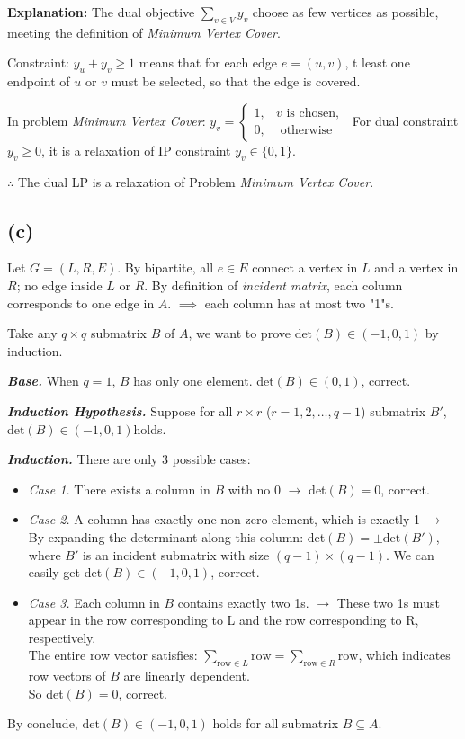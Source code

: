 \documentclass[11pt]{article}
\begin{document}
\textbf{Explanation: }The dual objective $\sum_{v \in V} y_v $ choose as few vertices as possible, meeting the definition of \textit{Minimum Vertex Cover}. 

Constraint: $y_u + y_v \ge 1$ means that for each edge $e = (u, v)$, 
t least one endpoint of $u$ or $v$ must be selected, so that the edge is covered.

In problem \textit{Minimum Vertex Cover}: $y_v = \begin{cases}
    1, & v \text{ is chosen, } \\
    0, & \text{ otherwise}
\end{cases}$
For dual constraint $y_v \ge 0$, it is a relaxation of IP constraint $y_v \in \{0, 1\}$. 

$\therefore$ The dual LP is a relaxation of Problem \textit{Minimum Vertex Cover}. 

\subsection*{(c)}
Let $G = (L, R, E)$. By bipartite, all $e \in E$ connect a vertex in $L$ and a vertex in $R$; no edge inside $L $ or $R$. 
By definition of \textit{incident matrix}, each column corresponds to one edge in $A$. 
$\implies$ each column has at most two "1"s.

Take any $q \times q$ submatrix $B$ of $A$, we want to prove $\text{det}(B) \in (-1, 0, 1)$ by induction. 

\textit{\textbf{Base.} }When $q = 1$, $B $ has only one element. det$(B) \in (0, 1)$, correct. 

\textit{\textbf{Induction Hypothesis.} }Suppose for all $r \times r$ ($r =1, 2, \dots, q-1$) submatrix $B'$, det$(B) \in (-1, 0, 1) $holds. 

\textit{\textbf{Induction.} }There are only 3 possible cases: 
\begin{itemize}
    \item \textit{Case 1. }There exists a column in $B$ with no 0 $ \to $ det$(B) = 0$, correct. 
    \item \textit{Case 2. }A column has exactly one non-zero element, which is exactly 1 
    $ \to $ By expanding the determinant along this column: det$(B) = \pm \text{det}(B')$, where $B'$ is an incident submatrix with size $(q-1)\times (q-1)$. 
    We can easily get det$(B) \in (-1, 0, 1)$, correct.
    \item \textit{Case 3. }Each column in $B$ contains exactly two 1s. $ \to $ These two 1s must appear in the row corresponding to L and the row corresponding to R, respectively.
    \\ The entire row vector satisfies: $\sum_{\text{row} \in L}\text{row} = \sum_{\text{row} \in R} \text{row}$, which indicates row vectors of $B$ are linearly dependent.
    \\ So det$(B) = 0$, correct. 
\end{itemize}
By conclude, $\text{det}(B) \in (-1, 0, 1)$ holds for all submatrix $B \subseteq A$. 
\end{document}

